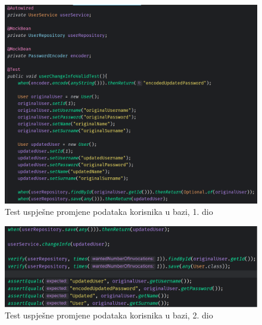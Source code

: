						\begin{figure}[H]
			\includegraphics[scale=0.4]{slike/userChangeInfoValidTest1.PNG} %
			\centering
			\caption{Test uspješne promjene podataka korisnika u bazi, 1. dio}
			\label{Test uspješne promjene podataka korisnika u bazi, 1. dio}
		\end{figure}
		
								\begin{figure}[H]
			\includegraphics[scale=0.4]{slike/userChangeInfoValidTest2.PNG} %
			\centering
			\caption{Test uspješne promjene podataka korisnika u bazi, 2. dio}
			\label{Test uspješne promjene podataka korisnika u bazi, 2. dio}
		\end{figure}

















